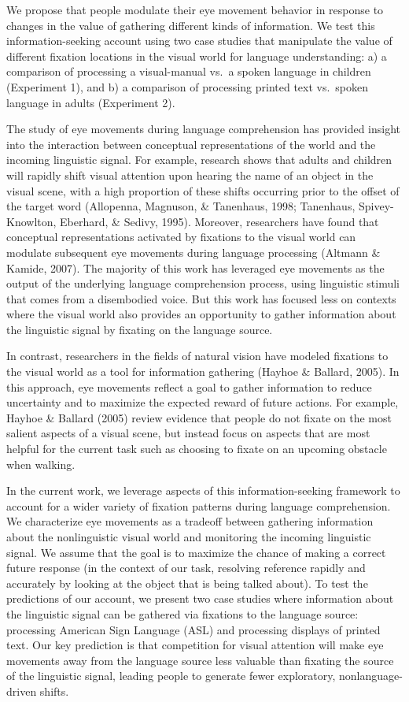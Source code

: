 \documentclass[10pt, letterpaper]{article}
\begin{document}
We propose that people modulate their eye movement behavior in response
to changes in the value of gathering different kinds of information. We
test this information-seeking account using two case studies that
manipulate the value of different fixation locations in the visual world
for language understanding: a) a comparison of processing a
visual-manual vs.~a spoken language in children (Experiment 1), and b) a
comparison of processing printed text vs.~spoken language in adults
(Experiment 2).

The study of eye movements during language comprehension has provided
insight into the interaction between conceptual representations of the
world and the incoming linguistic signal. For example, research shows
that adults and children will rapidly shift visual attention upon
hearing the name of an object in the visual scene, with a high
proportion of these shifts occurring prior to the offset of the target
word (Allopenna, Magnuson, \& Tanenhaus, 1998; Tanenhaus,
Spivey-Knowlton, Eberhard, \& Sedivy, 1995). Moreover, researchers have
found that conceptual representations activated by fixations to the
visual world can modulate subsequent eye movements during language
processing (Altmann \& Kamide, 2007). The majority of this work has
leveraged eye movements as the output of the underlying language
comprehension process, using linguistic stimuli that comes from a
disembodied voice. But this work has focused less on contexts where the
visual world also provides an opportunity to gather information about
the linguistic signal by fixating on the language source.

In contrast, researchers in the fields of natural vision have modeled
fixations to the visual world as a tool for information gathering
(Hayhoe \& Ballard, 2005). In this approach, eye movements reflect a
goal to gather information to reduce uncertainty and to maximize the
expected reward of future actions. For example, Hayhoe \& Ballard (2005)
review evidence that people do not fixate on the most salient aspects of
a visual scene, but instead focus on aspects that are most helpful for
the current task such as choosing to fixate on an upcoming obstacle when
walking.

In the current work, we leverage aspects of this information-seeking
framework to account for a wider variety of fixation patterns during
language comprehension. We characterize eye movements as a tradeoff
between gathering information about the nonlinguistic visual world and
monitoring the incoming linguistic signal. We assume that the goal is to
maximize the chance of making a correct future response (in the context
of our task, resolving reference rapidly and accurately by looking at
the object that is being talked about). To test the predictions of our
account, we present two case studies where information about the
linguistic signal can be gathered via fixations to the language source:
processing American Sign Language (ASL) and processing displays of
printed text. Our key prediction is that competition for visual
attention will make eye movements away from the language source less
valuable than fixating the source of the linguistic signal, leading
people to generate fewer exploratory, nonlanguage-driven shifts.
\end{document}

